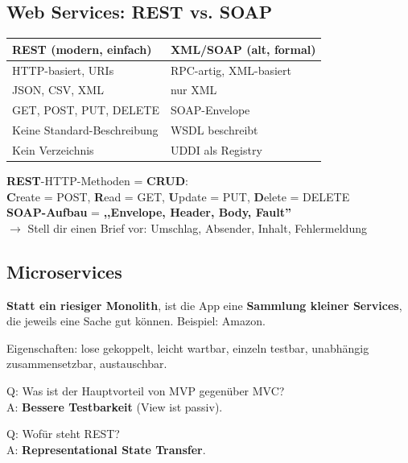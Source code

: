 \documentclass[11pt,a4paper]{article}
\renewcommand{\arraystretch}{1.25}
\begin{document}
\subsection{Web Services: REST vs. SOAP}

\begin{center}
\renewcommand{\arraystretch}{1.35}
\begin{tabularx}{\linewidth}{X|X}
\toprule
\textbf{REST (modern, einfach)} & \textbf{XML/SOAP (alt, formal)}\\
\midrule
HTTP-basiert, URIs & RPC-artig, XML-basiert\\
JSON, CSV, XML & nur XML\\
GET, POST, PUT, DELETE & SOAP-Envelope\\
Keine Standard-Beschreibung & WSDL beschreibt\\
Kein Verzeichnis & UDDI als Registry\\
\bottomrule
\end{tabularx}
\end{center}

\begin{merkhilfe}
\textbf{REST}-HTTP-Methoden = \textbf{CRUD}:\\
\textbf{C}reate = POST, \textbf{R}ead = GET, \textbf{U}pdate = PUT, \textbf{D}elete = DELETE\\[4pt]
\textbf{SOAP-Aufbau} = \textbf{,,Envelope, Header, Body, Fault''}\\
$\rightarrow$ Stell dir einen Brief vor: Umschlag, Absender, Inhalt, Fehlermeldung
\end{merkhilfe}

\subsection{Microservices}

\begin{story}
\textbf{Statt ein riesiger Monolith}, ist die App eine \textbf{Sammlung kleiner Services}, die jeweils eine Sache gut können. Beispiel: Amazon.
\end{story}

\begin{keyfacts}
Eigenschaften: lose gekoppelt, leicht wartbar, einzeln testbar, unabhängig zusammensetzbar, austauschbar.
\end{keyfacts}

\begin{quickcheck}
Q: Was ist der Hauptvorteil von MVP gegenüber MVC?\\
A: \textbf{Bessere Testbarkeit} (View ist passiv).

Q: Wofür steht REST?\\
A: \textbf{Representational State Transfer}.
\end{quickcheck}
\end{document}
